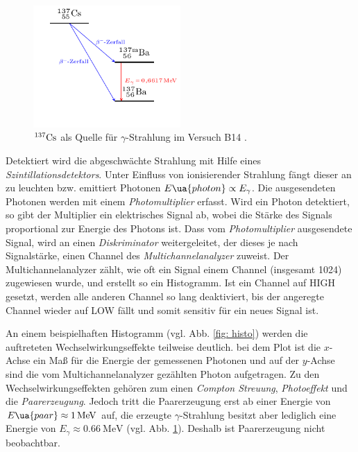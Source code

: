 \begin{figure}[h]
  \centering
  \includegraphics[width=0.5\textwidth]{pics/tikz-Energieschema.pdf}
  \caption{$^{137}\ce{Cs}$ als Quelle für $\gamma$-Strahlung im Versuch B14 \cite{luckyjosh}.}
  \label{fig: zerfall}
\end{figure}

Detektiert wird die abgeschwächte Strahlung mit Hilfe eines \emph{Szintillationsdetektors}.
Unter Einfluss von ionisierender Strahlung fängt dieser an zu leuchten bzw. emittiert Photonen $E\ua{photon}\propto E_\gamma$.
Die ausgesendeten Photonen werden mit einem \emph{Photomultiplier} erfasst. Wird ein Photon detektiert,
so gibt der Multiplier ein elektrisches Signal ab, wobei die Stärke des Signals proportional zur Energie des Photons ist.
Dass vom \emph{Photomultiplier} ausgesendete Signal,
wird an einen \emph{Diskriminator} weitergeleitet, der dieses je nach Signalstärke, einen Channel des %
\emph{Multichannelanalyzer} zuweist. Der Multichannelanalyzer zählt, wie oft ein Signal einem Channel (insgesamt 1024) zugewiesen wurde, und %
erstellt so ein Histogramm. Ist ein Channel auf HIGH gesetzt, werden alle anderen Channel so lang deaktiviert,
bis der angeregte Channel wieder auf LOW fällt und somit sensitiv für ein neues Signal ist.

An einem beispielhaften Histogramm (vgl. Abb. \ref{fig: histo}) werden die auftreteten Wechselwirkungseffekte teilweise deutlich.
bei dem Plot ist die $x$-Achse ein Maß für die Energie der gemessenen Photonen und auf der $y$-Achse sind die vom Multichannelanalyzer %
gezählten Photon aufgetragen. %
Zu den Wechselwirkungseffekten gehören zum einen \emph{Compton Streuung}, \emph{Photoeffekt} und die \emph{Paarerzeugung}. %
Jedoch tritt die Paarerzeugung erst ab einer Energie von $E\ua{paar}\approx \SI{1}{\mega\eV}$ auf, die erzeugte $\gamma$-Strahlung %
besitzt aber lediglich eine Energie von $E_{\gamma}\approx\SI{0.66}{\mega\eV}$ (vgl. Abb. \ref{fig: zerfall}).
Deshalb ist Paarerzeugung nicht beobachtbar.

